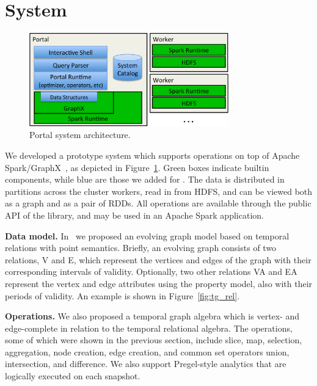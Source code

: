 \section{System}
\label{sec:sys}

\begin{figure}[t]
\centering
\includegraphics[width=3.4in]{figs/architecture.pdf}
\vspace{-0.4cm}
\caption{Portal system architecture.}
\vspace{-0.4cm}
\label{fig:arch}
\end{figure}

We developed a prototype system \ql which supports \tga operations on
top of Apache Spark/GraphX~\cite{DBLP:conf/osdi/GonzalezXDCFS14}, as
depicted in Figure~\ref{fig:arch}.  Green boxes indicate builtin
components, while blue are those we added for \ql.  The data is
distributed in partitions across the cluster workers, read in from
HDFS, and can be viewed both as a graph and as a pair of RDDs.  All
\tg operations are available through the public API of the \ql
library, and may be used in an Apache Spark application.

{\bf Data model.}  In~\cite{PortalarXiv2016} we proposed an evolving
graph model \tg based on temporal relations with point semantics.
Briefly, an evolving graph consists of two relations, V and E, which
represent the vertices and edges of the graph with their corresponding
intervals of validity.  Optionally, two other relations VA and EA
represent the vertex and edge attributes using the property model,
also with their periods of validity.  An example is shown in
Figure~\ref{fig:tg_rel}.

{\bf Operations.}  We also proposed a temporal graph algebra \tga
which is vertex- and edge-complete in relation to the temporal
relational algebra.  The \tga operations, some of which were shown in
the previous section, include slice, map, selection, aggregation, node
creation, edge creation, and common set operators union, intersection,
and difference.  We also support Pregel-style analytics that are
logically executed on each snapshot.

